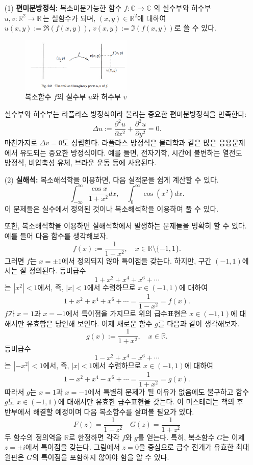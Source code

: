 \begin{itemize}
\item[(1)] {\bf 편미분방정식:}  복소미분가능한 함수 $f:\mathbb C \to \mathbb C$ 의 
실수부와 허수부 $u,v: \mathbb R^2 \to \mathbb R\,$는 실함수가 되며, 
$(x,y)\in \mathbb R^2$에 대하여 $u(x,y) := \Re(f(x,y))$, $v(x,y):=\Im(f(x,y))$로 쓸 수 있다.

\begin{figure}[!h]
\begin{center}
\includegraphics[width=0.5\textwidth]{./SaltChapter/preface-fig-0-2}
\end{center}
\label{fig:0.2}
\caption{복소함수 $f$의 실수부 $u$와 허수부 $v$}
\end{figure}

실수부와 허수부는 라플라스 방정식이라 불리는 중요한 편미분방정식을 만족한다:
$$
\Delta u := \frac{\partial^2 u}{\partial x^2} + \frac{\partial^2 u}{\partial y^2} = 0.
$$
마찬가지로 $\Delta v=0$도 성립한다.
라플라스 방정식은 물리학과 같은 많은 응용문제에서 유도되는 중요한 방정식이다.
예를 들면, 전자기학, 시간에 불변하는 열전도 방정식, 비압축성 유체, 브라운 운동 등에 사용된다.

\item[(2)] {\bf 실해석:} 복소해석학을 이용하면, 다음 실적분을  쉽게 계산할 수 있다.
$$
\int_{-\infty}^\infty \frac{\cos x}{1+x^2}dx, 
\quad
\int_0^\infty \cos(x^2)dx.
$$
이 문제들은 실수에서 정의된 것이나 복소해석학을 이용하여 풀 수 있다.

또한, 복소해석학을 이용하면 실해석학에서 발생하는 문제들을 명확히 할 수 있다.
예를 들어 다음 함수를 생각해보자.
$$
f(x):= \frac{1}{1-x^2}, \quad
x\in \mathbb R \setminus \{-1,1\}.
$$
그러면 $f$는 $x=\pm1$에서 정의되지 않아 특이점을 갖는다.
하지만, 구간 $(-1,1)$에서는 잘 정의된다.
등비급수
$$
1+x^2+x^4+x^6 +\cdots
$$
는  $|x^2|<1$에서, 즉, $|x|<1$에서 수렴하므로 $x\in (-1,1)$에 대하여
$$
1+x^2+x^4+x^6 +\cdots = \frac{1}{1-x^2} = f(x).
$$
$f$가 $x=1$과 $x=-1$에서 특이점을 가지므로 위의 급수표현은 $x\in(-1,1)$에 대해서만 유효함은 당연해 보인다.
이제 새로운 함수 $g$를 다음과 같이 생각해보자.
$$
g(x):= \frac1{1+x^2}, \quad x\in \mathbb R.
$$
등비급수
$$
1-x^2+x^4-x^6 +\cdots
$$
는  $|-x^2|<1$에서, 즉, $|x|<1$에서 수렴하므로 $x\in (-1,1)$에 대하여
$$
1-x^2+x^4-x^6 +\cdots = \frac{1}{1+x^2} = g(x).
$$
따라서 
$g$는 $x=1$과 $x=-1$에서 특별히 문제가 될 이유가 없음에도 불구하고
함수 $g$도 $x\in(-1,1)$에 대해서만 유효한 급수표현을 갖는다.
이 미스테리는 책의 후반부에서 해결할 예정이며 다음 복소함수를 살펴볼 필요가 있다.
$$
F(z) = \frac1{1-z^2} \quad
G(z) = \frac1{1+z^2}
$$
두 함수의 정의역을 $\mathbb R$로 한정하면 각각 $f$와 $g$를 얻는다.
특히, 복소함수 $G$는 이제 $z=\pm i$에서 특이점을 갖는다.
그림에서 $z=0$을 중심으로 급수 전개가 유효한 최대 원판은
$G$의 특이점을 포함하지 않아야 함을 알 수 있다.


\end{itemize}
